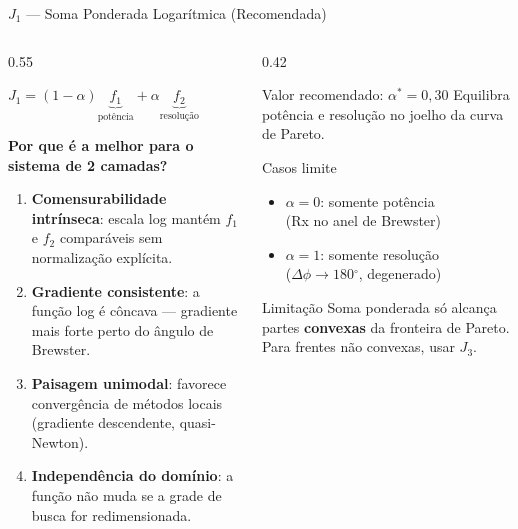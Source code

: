 \documentclass[aspectratio=169, 10pt]{beamer}
\newcommand{\gdeg}{\ensuremath{^{\circ}}}
\begin{document}
\begin{frame}{$J_1$ --- Soma Ponderada Logarítmica (Recomendada)}
  \begin{columns}[T]
    \begin{column}{0.55\textwidth}
      \begin{block}{}
        \centering
        \large
        $J_1 = (1-\alpha)\underbrace{f_1}_{\text{potência}}
             + \alpha\underbrace{f_2}_{\text{resolução}}$
      \end{block}
      \vspace{0.5em}
      \textbf{Por que é a melhor para o sistema de 2 camadas?}
      \begin{enumerate}
        \item \textbf{Comensurabilidade intrínseca}: escala log mantém $f_1$
              e $f_2$ comparáveis sem normalização explícita.
        \vspace{0.3em}
        \item \textbf{Gradiente consistente}: a função log é côncava ---
              gradiente mais forte perto do ângulo de Brewster.
        \vspace{0.3em}
        \item \textbf{Paisagem unimodal}: favorece convergência de métodos
              locais (gradiente descendente, quasi-Newton).
        \vspace{0.3em}
        \item \textbf{Independência do domínio}: a função não muda se a
              grade de busca for redimensionada.
      \end{enumerate}
    \end{column}
    \begin{column}{0.42\textwidth}
      \begin{alertblock}{Valor recomendado: $\alpha^* = 0{,}30$}
        Equilibra potência e resolução no joelho da curva de Pareto.
      \end{alertblock}
      \vspace{0.5em}
      \begin{block}{Casos limite}
        \begin{itemize}
          \item $\alpha = 0$: somente potência\\
                (Rx no anel de Brewster)
          \vspace{0.3em}
          \item $\alpha = 1$: somente resolução\\
                ($\Delta\phi \to 180\gdeg$, degenerado)
        \end{itemize}
      \end{block}
      \vspace{0.5em}
      \begin{block}{Limitação}
        \small Soma ponderada só alcança partes \textbf{convexas} da
        fronteira de Pareto. Para frentes não convexas, usar $J_3$.
      \end{block}
    \end{column}
  \end{columns}
\end{frame}
\end{document}
